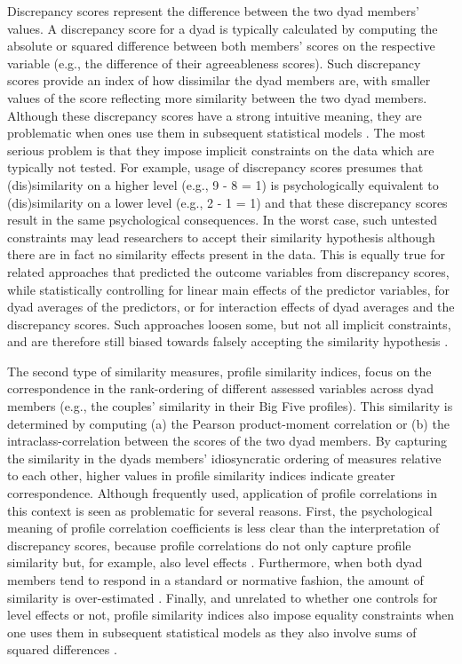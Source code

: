 \documentclass[jou,a4paper,draftfirst]{apa6}
\begin{document}
Discrepancy scores represent the difference between the two dyad members' values. A discrepancy score for a dyad is typically calculated by computing the absolute or squared difference between both members' scores on the respective variable (e.g., the difference of their agreeableness scores). Such discrepancy scores provide an index of how dissimilar the dyad members are, with smaller values of the score reflecting more similarity between the two dyad members. Although these discrepancy scores have a strong intuitive meaning, they are problematic when ones use them in subsequent statistical models \parencite{BlantonEtAl2006,Edwards2001,Johns1981,PeterEtAl1993}. The most serious problem is that they impose implicit constraints on the data which are typically not tested. For example, usage of discrepancy scores presumes that (dis)similarity on a higher level (e.g., 9 - 8 = 1) is psychologically equivalent to (dis)similarity on a lower level (e.g., 2 - 1 = 1) and that these discrepancy scores result in the same psychological consequences. In the worst case, such untested constraints may lead researchers to accept their similarity hypothesis although there are in fact no similarity effects present in the data. This is equally true for related approaches that predicted the outcome variables from discrepancy scores, while statistically controlling for linear main effects of the predictor variables, for dyad averages of the predictors, or for interaction effects of dyad averages and the discrepancy scores. Such approaches loosen some, but not all implicit constraints, and are therefore still biased towards falsely accepting the similarity hypothesis \parencite[see also][]{Edwards2001}.

The second type of similarity measures, profile similarity indices, focus on the correspondence in the rank-ordering of different assessed variables across dyad members (e.g., the couples' similarity in their Big Five profiles). This similarity is determined by computing (a) the Pearson product-moment correlation or (b) the intraclass-correlation between the scores of the two dyad members. By capturing the similarity in the dyads members' idiosyncratic ordering of measures relative to each other, higher values in profile similarity indices indicate greater correspondence. Although frequently used, application of profile correlations in this context is seen as problematic for several reasons. First, the psychological meaning of profile correlation coefficients is less clear than the interpretation of discrepancy scores, because profile correlations do not only capture profile similarity but, for example, also level effects \parencite[see][]{kenny_dyadic_2006}. Furthermore, when both dyad members tend to respond in a standard or normative fashion, the amount of similarity is over-estimated  \parencite{Cronbach1955,CronbachGleser1953, KennyAcitelli1994}. Finally, and unrelated to whether one controls for level effects or not, profile similarity indices also impose equality constraints when one uses them in subsequent statistical models as they also involve sums of squared differences \parencite{EdwardsParry1993}.
\end{document}
